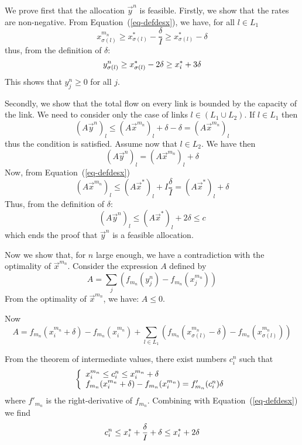 We prove first that the allocation $\vec{y}^n$ is feasible.
Firstly, we show that the rates are non-negative. From
Equation~(\ref{eq-defdesx}), we have, for all $l \in L_1$
 $$
 x^{m_n}_{\sigma(l)} \geq x^*_{\sigma(l)} - \frac{\delta}{I}
 \geq x^*_{\sigma(l)} - \delta
 $$
 thus, from the definition of $\delta$:
\begin{equation}\mylabel{eq-3del}
 y^n_{\sigma(l)} \geq x^*_{\sigma(l)} - 2 \delta \geq  x^*_i + 3 \delta
\end{equation}
This shows that $y^n_j \geq 0$ for all $j$.

Secondly, we show that the total flow on every link is bounded by
the capacity of the link. We need to consider only the case of
links $l \in (L_1 \cup L_2)$. If $l \in L_1$ then
$$(A\vec{y}^n)_{l} \leq (A\vec{x}^{m_n})_{l}+ \delta - \delta = (A\vec{x}^{m_n})_{l}$$
thus the condition is satisfied. Assume now that $l \in L_2$. We
have then
 $$
(A\vec{y}^n)_{l} = (A\vec{x}^{m_n})_{l} + \delta $$
 Now, from Equation~(\ref{eq-defdesx})
 $$
 (A\vec{x}^{m_n})_{l} \leq (A\vec{x}^{*})_{l} + I \frac{\delta}{I}
 =(A\vec{x}^{*})_{l} + \delta
 $$
 Thus, from the definition of $\delta$:
 $$
 (A\vec{y}^n)_{l} \leq (A\vec{x}^{*})_{l} + 2 \delta \leq c
 $$
which ends the proof that $\vec{y}^n$ is a feasible allocation.

Now we show that, for $n$ large enough, we have a contradiction
with the optimality of $\vec{x}^{m_n}$. Consider the expression
$A$ defined by
$$A =
 \sum_j \left(f_{m_n}(y^{n}_j) - f_{m_n}(x^{m_n}_j)\right)
 $$
 From the optimality of $\vec{x}^{m_n}$,  we have: $A \leq 0$.

Now
$$A = f_{m_n}(x^{m_n}_i + \delta) - f_{m_n}(x^{m_n}_i ) +
\sum_{l \in L_1} \left(f_{m_n}(x^{m_n}_{\sigma(l)}-\delta) -
f_{m_n}(x^{m_n}_{\sigma(l)})\right)
$$

From the theorem of intermediate values, there exist numbers
$c^{n}_i$ such that
$$
\left\{\begin{array}{l} 
 x^{m_n}_i \leq c^{n}_i \leq x^{m_n}_i + \delta \\
 f_{m_n}(x^{m_n}_i + \delta) - f_{m_n}(x^{m_n}_i ) =
 f'_{m_n}(c^{n}_i)\delta
  \end{array} \right.
$$
where $f'_{m_n}$ is the right-derivative of $f_{m_n}$. Combining
with Equation~(\ref{eq-defdesx}) we find
\begin{equation}\mylabel{eq-ci}
c^{n}_i \leq x^*_i +  \frac{\delta}{I} + \delta \leq x^*_i + 2
\delta
\end{equation}


